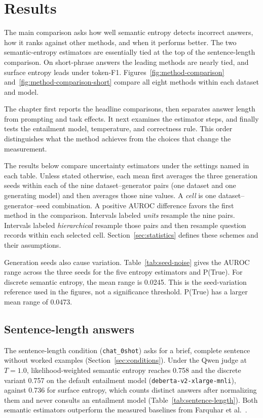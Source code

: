 \chapter{Results}
\label{ch:results}

The main comparison asks how well semantic entropy detects incorrect answers,
how it ranks against other methods, and when it performs better. The two
semantic-entropy estimators are essentially tied at the top of the
sentence-length comparison. On short-phrase answers the leading methods are
nearly tied, and surface entropy leads under token-F1.
Figures~\ref{fig:method-comparison} and~\ref{fig:method-comparison-short}
compare all eight methods within each dataset and model.

The chapter first reports the headline comparisons, then separates answer
length from prompting and task effects. It next examines the estimator steps,
and finally tests the entailment model, temperature, and correctness rule.
This order distinguishes what the method achieves from the choices that change
the measurement.

The results below compare uncertainty estimators under the settings named in
each table. Unless stated otherwise, each mean first averages the three
generation seeds within each of the nine dataset--generator pairs (one dataset
and one generating model) and then averages those nine values. A \emph{cell} is
one dataset--generator--seed combination. A positive AUROC difference favors
the first method in the comparison. Intervals labeled \emph{units} resample
the nine pairs. Intervals labeled \emph{hierarchical} resample those pairs
and then resample question records within each selected cell. Section~\ref{sec:statistics}
defines these schemes and their assumptions.

Generation seeds also cause variation. Table~\ref{tab:seed-noise} gives the
AUROC range across the three seeds for the five entropy estimators and P(True). For
discrete semantic entropy, the mean range is 0.0245. This is the seed-variation
reference used in the figures, not a significance threshold. P(True) has a
larger mean range of 0.0473.



\section{Sentence-length answers}
\label{sec:sentence-length-results}

The sentence-length condition (\texttt{chat\_0shot}) asks for a brief, complete
sentence without worked examples (Section~\ref{sec:conditions}). Under the Qwen judge at
$T=1.0$, likelihood-weighted semantic entropy reaches 0.758 and the discrete
variant 0.757 on the default entailment model
(\texttt{deberta-v2-xlarge-mnli}), against 0.736 for surface entropy, which
counts distinct answers after normalizing them and never consults an
entailment model (Table~\ref{tab:sentence-length}).
Both semantic estimators outperform the measured baselines from
Farquhar et al.~\cite{semantic_entropy_nature_2024}.

